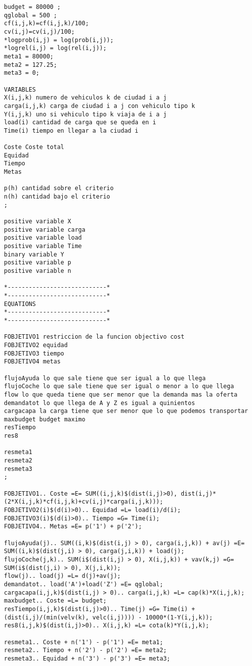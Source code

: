 \documentclass[]{article}
\begin{document}
\begin{lstlisting}
budget = 80000 ;
qglobal = 500 ;
cf(i,j,k)=cf(i,j,k)/100;
cv(i,j)=cv(i,j)/100;
*logprob(i,j) = log(prob(i,j));
*logrel(i,j) = log(rel(i,j));
meta1 = 80000;
meta2 = 127.25;
meta3 = 0;

VARIABLES
X(i,j,k) numero de vehiculos k de ciudad i a j
carga(i,j,k) carga de ciudad i a j con vehiculo tipo k
Y(i,j,k) uno si vehiculo tipo k viaja de i a j
load(i) cantidad de carga que se queda en i
Time(i) tiempo en llegar a la ciudad i 

Coste Coste total
Equidad 
Tiempo
Metas

p(h) cantidad sobre el criterio
n(h) cantidad bajo el criterio
;

positive variable X
positive variable carga
positive variable load
positive variable Time
binary variable Y
positive variable p
positive variable n

*----------------------------*
*----------------------------*
EQUATIONS
*----------------------------*
*----------------------------*

FOBJETIVO1 restriccion de la funcion objectivo cost
FOBJETIVO2 equidad 
FOBJETIVO3 tiempo
FOBJETIVO4 metas

flujoAyuda lo que sale tiene que ser igual a lo que llega
flujoCoche lo que sale tiene que ser igual o menor a lo que llega
flow lo que queda tiene que ser menor que la demanda mas la oferta
demandatot lo que llega de A y Z es igual a quinientos
cargacapa la carga tiene que ser menor que lo que podemos transportar
maxbudget budget maximo
resTiempo
res8

resmeta1
resmeta2
resmeta3
;

FOBJETIVO1.. Coste =E= SUM((i,j,k)$(dist(i,j)>0), dist(i,j)*(2*X(i,j,k)*cf(i,j,k)+cv(i,j)*carga(i,j,k)));
FOBJETIVO2(i)$(d(i)>0).. Equidad =L= load(i)/d(i);
FOBJETIVO3(i)$(d(i)>0).. Tiempo =G= Time(i);
FOBJETIVO4.. Metas =E= p('1') + p('2');

flujoAyuda(j).. SUM((i,k)$(dist(i,j) > 0), carga(i,j,k)) + av(j) =E= SUM((i,k)$(dist(j,i) > 0), carga(j,i,k)) + load(j);
flujoCoche(j,k).. SUM(i$(dist(i,j) > 0), X(i,j,k)) + vav(k,j) =G= SUM(i$(dist(j,i) > 0), X(j,i,k));
flow(j).. load(j) =L= d(j)+av(j);
demandatot.. load('A')+load('Z') =E= qglobal;
cargacapa(i,j,k)$(dist(i,j) > 0).. carga(i,j,k) =L= cap(k)*X(i,j,k);
maxbudget.. Coste =L= budget;
resTiempo(i,j,k)$(dist(i,j)>0).. Time(j) =G= Time(i) + (dist(i,j)/(min(velv(k), velc(i,j)))) - 10000*(1-Y(i,j,k));
res8(i,j,k)$(dist(i,j)>0).. X(i,j,k) =L= cota(k)*Y(i,j,k);

resmeta1.. Coste + n('1') - p('1') =E= meta1;
resmeta2.. Tiempo + n('2') - p('2') =E= meta2;
resmeta3.. Equidad + n('3') - p('3') =E= meta3;


\end{lstlisting}
\end{document}
